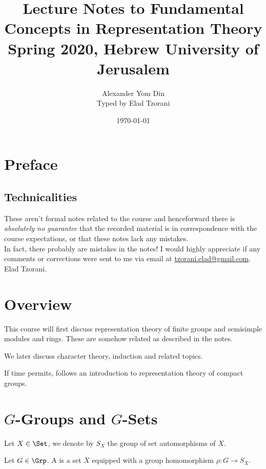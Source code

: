 \documentclass[10pt,a4paper,twoside,openany,hidelinks]{book}
\title{Lecture Notes to Fundamental Concepts in Representation Theory \\ \large{Spring 2020, Hebrew University of Jerusalem}}
\author{Alexander Yom Din\\ \large{Typed by Elad Tzorani}}
\date{\today}
\begin{document}
\frontmatter
{}
\tableofcontents
\countlectures
\newpage

\chapter*{Preface}
 

\section*{Technicalities}

These aren't formal notes related to the course and henceforward there is \emph{absolutely no guarantee} that the recorded material is in correspondence with the course expectations, or that these notes lack any mistakes.\\
In fact, there probably are mistakes in the notes! I would highly appreciate if any comments or corrections were sent to me via email at \href{mailto:tzorani.elad@gmail.com}{tzorani.elad@gmail.com}.\\
Elad Tzorani.

\mainmatter

\chapter*{Overview}

This course will first discuss representation theory of finite groups and semisimple modules and rings.
These are somehow related as described in the notes.

We later discuss character theory, induction and related topics.

If time permits, follows an introduction to representation theory of compact groups.

\chapter{$G$-Groups and $G$-Sets}

\begin{notation}
Let $X \in \Set$, we denote by $S_X$ the group of set automorphisms of $X$.
\end{notation}

\begin{definition}[$G$-Set]
Let $G \in \Grp$. A  is a set $X$ equipped with a group homomorphism $\rho \colon G \to S_X$.
\end{definition}
\end{document}

